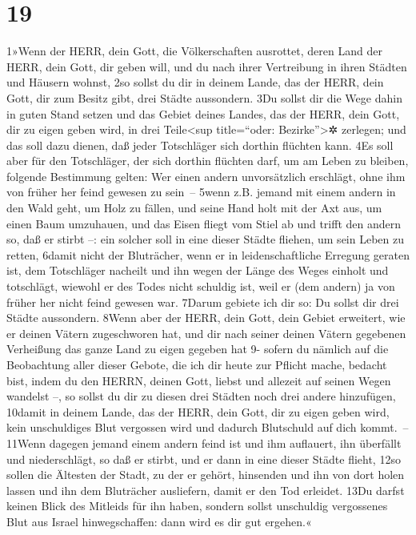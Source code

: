 \hypertarget{section-18}{%
\section{19}\label{section-18}}

1»Wenn der HERR, dein Gott, die Völkerschaften ausrottet, deren Land der
HERR, dein Gott, dir geben will, und du nach ihrer Vertreibung in ihren
Städten und Häusern wohnst, 2so sollst du dir in deinem Lande, das der
HERR, dein Gott, dir zum Besitz gibt, drei Städte aussondern. 3Du sollst
dir die Wege dahin in guten Stand setzen und das Gebiet deines Landes,
das der HERR, dein Gott, dir zu eigen geben wird, in drei
Teile\textless sup title=``oder: Bezirke''\textgreater✲ zerlegen; und
das soll dazu dienen, daß jeder Totschläger sich dorthin flüchten kann.
4Es soll aber für den Totschläger, der sich dorthin flüchten darf, um am
Leben zu bleiben, folgende Bestimmung gelten: Wer einen andern
unvorsätzlich erschlägt, ohne ihm von früher her feind gewesen zu
sein~-- 5wenn z.B. jemand mit einem andern in den Wald geht, um Holz zu
fällen, und seine Hand holt mit der Axt aus, um einen Baum umzuhauen,
und das Eisen fliegt vom Stiel ab und trifft den andern so, daß er
stirbt --: ein solcher soll in eine dieser Städte fliehen, um sein Leben
zu retten, 6damit nicht der Bluträcher, wenn er in leidenschaftliche
Erregung geraten ist, dem Totschläger nacheilt und ihn wegen der Länge
des Weges einholt und totschlägt, wiewohl er des Todes nicht schuldig
ist, weil er (dem andern) ja von früher her nicht feind gewesen war.
7Darum gebiete ich dir so: Du sollst dir drei Städte aussondern. 8Wenn
aber der HERR, dein Gott, dein Gebiet erweitert, wie er deinen Vätern
zugeschworen hat, und dir nach seiner deinen Vätern gegebenen Verheißung
das ganze Land zu eigen gegeben hat 9- sofern du nämlich auf die
Beobachtung aller dieser Gebote, die ich dir heute zur Pflicht mache,
bedacht bist, indem du den HERRN, deinen Gott, liebst und allezeit auf
seinen Wegen wandelst --, so sollst du dir zu diesen drei Städten noch
drei andere hinzufügen, 10damit in deinem Lande, das der HERR, dein
Gott, dir zu eigen geben wird, kein unschuldiges Blut vergossen wird und
dadurch Blutschuld auf dich kommt.~-- 11Wenn dagegen jemand einem andern
feind ist und ihm auflauert, ihn überfällt und niederschlägt, so daß er
stirbt, und er dann in eine dieser Städte flieht, 12so sollen die
Ältesten der Stadt, zu der er gehört, hinsenden und ihn von dort holen
lassen und ihn dem Bluträcher ausliefern, damit er den Tod erleidet.
13Du darfst keinen Blick des Mitleids für ihn haben, sondern sollst
unschuldig vergossenes Blut aus Israel hinwegschaffen: dann wird es dir
gut ergehen.«

